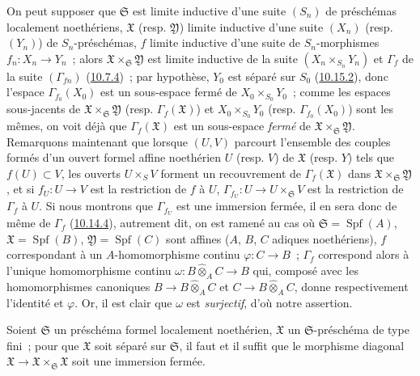 On peut supposer que $\mathfrak{S}$ est limite inductive d'une suite
$(S_n)$ de préschémas localement noethériens, $\mathfrak{X}$ (resp.
$\mathfrak{Y}$) limite inductive d'une suite $(X_n)$ (resp. $(Y_n)$) de
$S_n$-préschémas, $f$ limite inductive d'une suite de $S_n$-morphismes
$f_n:X_n\to Y_n$~; alors
$\mathfrak{X}\times_{\mathfrak{S}}\mathfrak{Y}$ est limite inductive de la
suite $(X_n\times_{S_n}Y_n)$ et $\Gamma_f$ de la suite
$(\Gamma_{fn})$ (\hyperref[I.10.7.4-fr]{10.7.4})~; par hypothèse, $Y_0$ est
séparé sur $S_0$ (\hyperref[I.10.15.2-fr]{10.15.2}), donc l'espace
$\Gamma_{f_0}(X_0)$ est un sous-espace fermé de
$X_0\times_{S_0}Y_0$~; comme les espaces sous-jacents de
$\mathfrak{X}\times_{\mathfrak{S}}\mathfrak{Y}$ (resp.
$\Gamma_f(\mathfrak{X})$) et $X_0\times_{S_0}Y_0$ (resp.
$\Gamma_{f_0}(X_0)$) sont les mêmes, on voit déjà que
$\Gamma_f(\mathfrak{X})$ est un sous-espace \emph{fermé} de
$\mathfrak{X}\times_{\mathfrak{S}}\mathfrak{Y}$. Remarquons maintenant que
lorsque $(U,V)$ parcourt l'ensemble des couples formés d'un ouvert formel
affine noethérien $U$ (resp. $V$) de $\mathfrak{X}$ (resp.
$Y$) tels que $f(U)\subset V$, les ouverts
$U\times_{S}V$ forment un recouvrement de
$\Gamma_f(\mathfrak{X})$ dans
$\mathfrak{X}\times_{\mathfrak{S}}\mathfrak{Y}$, et si
$f_U:U\to V$ est la restriction de $f$ à $U$,
$\Gamma_{f_U}:U\to U\times_{\mathfrak{S}}V$ est la restriction de
$\Gamma_f$ à $U$. Si nous montrons que $\Gamma_{f_U}$ est une immersion
fermée, il en sera donc de même de $\Gamma_f$
(\hyperref[I.10.14.4-fr]{10.14.4}), autrement dit, on est ramené au cas où
$\mathfrak{S}=\operatorname{Spf}(A)$,
$\mathfrak{X}=\operatorname{Spf}(B)$,
$\mathfrak{Y}=\operatorname{Spf}(C)$ sont affines ($A$, $B$, $C$ adiques
noethériens), $f$ correspondant à un $A$-homomorphisme continu
$\varphi:C\to B$~; $\Gamma_f$ correspond alors à l'unique homomorphisme
continu $\omega:B\widehat{\otimes}_A C\to B$ qui, composé avec les
homomorphismes canoniques $B\to B\widehat{\otimes}_A C$ et
$C\to B\widehat{\otimes}_A C$, donne respectivement l'identité et
$\varphi$. Or, il est clair que $\omega$ est \emph{surjectif}, d'où notre
assertion.

\begin{corollary}[10.15.5]
\label{I.10.15.5-fr}
Soient $\mathfrak{S}$ un préschéma formel localement noethérien,
$\mathfrak{X}$ un $\mathfrak{S}$-préschéma de type fini~; pour que
$\mathfrak{X}$ soit séparé sur $\mathfrak{S}$, il faut et il suffit que le
morphisme diagonal
$\mathfrak{X}\to\mathfrak{X}\times_{\mathfrak{S}}\mathfrak{X}$ soit une
immersion fermée.
\end{corollary}

